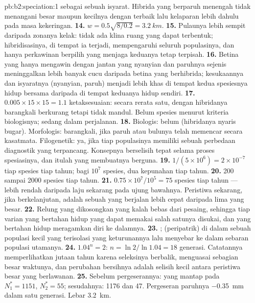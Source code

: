 \begin{solution}{pb:b2:speciation:1}
sebagai sebuah isyarat. Hibrida yang berparuh menengah tidak menangani
 besar maupun  kecilnya dengan terbaik lalu kelaparan lebih
dahulu pada masa kekeringan.
\textbf{14.} $w = 0.5\sqrt{8/0.2} = \qty{3.2}{km}$.
\textbf{15.} Pulaunya lebih sempit daripada zonanya kelak: tidak ada
klina ruang yang dapat terbentuk; hibridisasinya, di tempat ia terjadi,
mempengaruhi seluruh populasinya, dan hanya perkawinan berpilih yang
menjaga keduanya tetap terpisah.
\textbf{16.} Betina yang hanya mengawin dengan jantan yang nyanyian dan
paruhnya sejenis meninggalkan lebih banyak cucu daripada betina yang
berhibrida; kesukaannya dan isyaratnya (nyanyian, paruh) menjadi lebih
khas di tempat kedua spesiesnya hidup bersama daripada di tempat
keduanya hidup sendiri.
\textbf{17.} $0.005\times 15\times 15 = 1.1$ ketaksesuaian: secara
rerata satu, dengan hibridanya barangkali berkurang tetapi tidak
mandul. Belum spesies menurut kriteria biologisnya; sedang dalam
perjalanan.
\textbf{18.} Biologis: belum (hibridanya nyaris bugar). Morfologis:
barangkali, jika paruh atau bulunya telah memencar secara kasatmata.
Filogenetik: ya, jika tiap populasinya memiliki sebuah perbedaan
diagnostik yang terpancang. Konsepnya berselisih tepat selama proses
spesiasinya, dan itulah yang membuatnya berguna.
\textbf{19.} $1/(5\times 10^{6}) = 2\times 10^{-7}$ tiap spesies tiap
tahun; bagi $10^{7}$ spesies, dua kepunahan tiap tahun.
\textbf{20.} 200 sampai 2000 spesies tiap tahun.
\textbf{21.} $0.75\times 10^{7}/10^{5} = 75$ spesies tiap tahun ---
lebih rendah daripada laju sekarang pada ujung bawahnya. Peristiwa
sekarang, jika berkelanjutan, adalah sebuah  yang
berjalan lebih cepat daripada lima yang besar.
\textbf{22.} Relung yang dikosongkan yang kalah bebas dari pesaing,
sehingga tiap varian yang bertahan hidup yang dapat memakai salah
satunya disukai, dan yang bertahan hidup meragamkan diri ke dalamnya.
\textbf{23.} ;  (peripatrik) di
dalam sebuah populasi kecil yang terisolasi yang keturunannya lalu
menyebar ke dalam sebaran populasi utamanya.
\textbf{24.} $1.04^{n} = 2$: $n = \ln 2/\ln 1.04 = 18$ generasi.
Catatannya memperlihatkan jutaan tahun karena seleksinya berbalik,
 menguasai sebagian besar waktunya, dan perubahan
bersihnya adalah selisih kecil antara peristiwa besar yang berlawanan.
\textbf{25.} Sebelum pergeserannya:  yang mantap pada
$N_1^{*} =
1151$, $N_2^{*} = 55$; sesudahnya: 1176 dan 47. Pergeseran
paruhnya \qty{-0.35}{mm} dalam satu generasi. Lebar 
\qty{3.2}{km}.
\end{solution}
